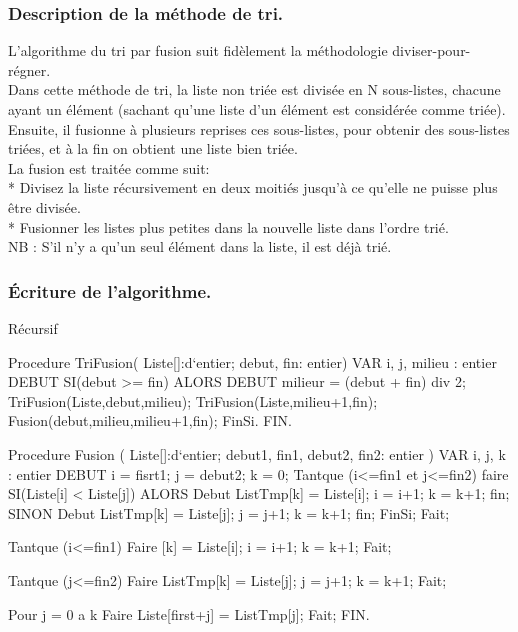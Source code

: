 \documentclass[12pt]{article}
\begin{document}
\subsubsection{Description de la méthode de tri.}
    L'algorithme du tri par fusion suit fidèlement la méthodologie diviser-pour-régner. \\
    Dans cette méthode de tri, la liste non triée est divisée en N sous-listes, chacune ayant un élément (sachant qu'une liste d'un élément est considérée comme triée). \\
    Ensuite, il fusionne à plusieurs reprises ces sous-listes, pour obtenir des sous-listes triées, et à la fin on obtient une liste bien triée.\\
    
    La fusion est traitée comme suit:\\
        * Divisez la liste récursivement en deux moitiés jusqu'à ce qu'elle ne puisse plus être divisée.\\
        * Fusionner les listes plus petites dans la nouvelle liste dans l'ordre trié.\\
        
    NB : S'il n'y a qu'un seul élément dans la liste, il est déjà trié.
        

\subsubsection{Écriture de l'algorithme.}

 Récursif
 \begin{sql}
Procedure TriFusion( Liste[]:d`entier; debut, fin: entier)
	VAR
		i, j, milieu : entier
	DEBUT
		SI(debut >= fin) 
		ALORS
            DEBUT
                milieur = (debut + fin) div 2;
                TriFusion(Liste,debut,milieu);
                TriFusion(Liste,milieu+1,fin);
                Fusion(debut,milieu,milieu+1,fin);
        FinSi.
	FIN.

Procedure Fusion ( Liste[]:d`entier; debut1, fin1, debut2, fin2: entier )
	VAR
		i, j, k : entier
	DEBUT
		i = fisrt1;
		j = debut2;
		k = 0;
        Tantque (i<=fin1 et j<=fin2) 
        faire
			SI(Liste[i] < Liste[j]) 
			ALORS
				Debut  
					ListTmp[k] = Liste[i];
                    i = i+1;
                    k = k+1;
                fin;
			SINON
				Debut
                    ListTmp[k] = Liste[j];
                    j = j+1;
                    k = k+1;
                fin;
            FinSi;
		Fait;

		Tantque (i<=fin1) 
		Faire
			[k] = Liste[i]; i = i+1; k = k+1;
        Fait;

        Tantque (j<=fin2) 
        Faire
        	ListTmp[k] = Liste[j];
            j = j+1; k = k+1;
        Fait;
            
        Pour j = 0 a k 
        Faire
            Liste[first+j] = ListTmp[j];
        Fait;
	FIN.
 \end{sql}
\end{document}
